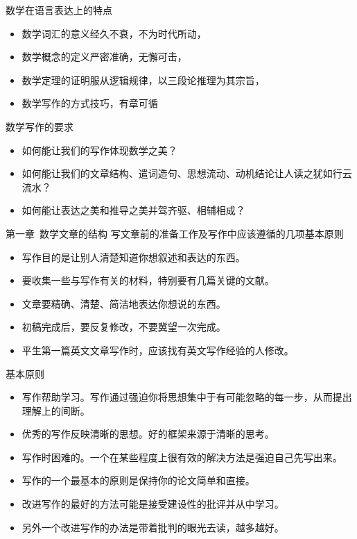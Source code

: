 \documentclass[13pt,fontset=mac]{ctexbeamer}
\begin{document}
\begin{frame}
	数学在语言表达上的特点
	\begin{itemize}
		\item 数学词汇的意义经久不衰，不为时代所动，
		\item 数学概念的定义严密准确，无懈可击，
		\item 数学定理的证明服从逻辑规律，以三段论推理为其宗旨，
		\item 数学写作的方式技巧，有章可循
	\end{itemize}
\vspace{15pt}
\pause
	数学写作的要求
\begin{itemize}
	\item 如何能让我们的写作体现数学之美？
	\item 如何能让我们的文章结构、遣词造句、思想流动、动机结论让人读之犹如行云流水？
	\item 如何能让表达之美和推导之美并驾齐驱、相辅相成？
\end{itemize}
\end{frame}




\begin{frame}{第一章~数学文章的结构}
	写文章前的准备工作及写作中应该遵循的几项基本原则
	\begin{itemize}
		\item  写作目的是让别人清楚知道你想叙述和表达的东西。
		\item 要收集一些与写作有关的材料，特别要有几篇关键的文献。
		\item 文章要精确、清楚、简洁地表达你想说的东西。
		\item 初稿完成后，要反复修改，不要冀望一次完成。
		\item 平生第一篇英文文章写作时，应该找有英文写作经验的人修改。
	\end{itemize}
\end{frame}

\begin{frame}{基本原则}

\begin{itemize}
	\item  写作帮助学习。写作通过强迫你将思想集中于有可能忽略的每一步，从而提出理解上的间断。
	\item 优秀的写作反映清晰的思想。好的框架来源于清晰的思考。
	\item  写作时困难的。一个在某些程度上很有效的解决方法是强迫自己先写出来。
	\item 写作的一个最基本的原则是保持你的论文简单和直接。
	\item 改进写作的最好的方法可能是接受建设性的批评并从中学习。
	\item 另外一个改进写作的办法是带着批判的眼光去读，越多越好。
\end{itemize}
\end{frame}
\end{document}
